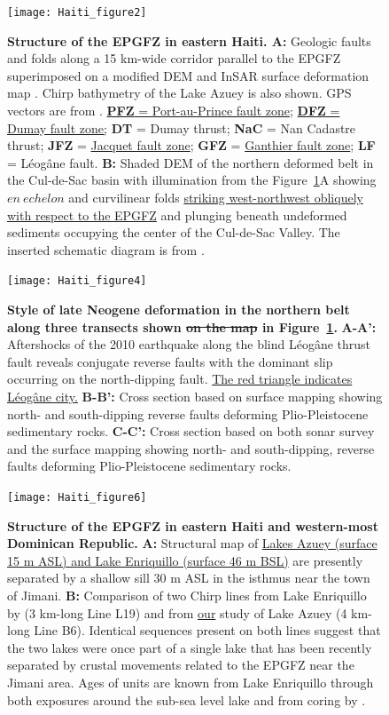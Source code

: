 \documentclass[linenumbers,draft]{agujournal}
\begin{document}
\begin{figure}
\centering
\texttt{[image: Haiti\_figure2]}
\caption{\textbf{Structure of the EPGFZ in eastern Haiti. A:} Geologic faults and folds along a 15 km-wide corridor parallel to the EPGFZ superimposed on a modified DEM and InSAR surface deformation map \citep{hayes2010complex,hashimoto2011fan}. Chirp bathymetry of the Lake Azuey is also shown. GPS vectors are from \citet{calais2010transpressional}. \underline{\textbf{PFZ} = Port-au-Prince fault zone}; \underline{\textbf{DFZ} = Dumay fault zone;} \textbf{DT} = Dumay thrust; \textbf{NaC} = Nan Cadastre thrust; \textbf{JFZ} = \ul{Jacquet fault zone}; \textbf{GFZ} = \ul{Ganthier fault zone}; \textbf{LF} = L\'eog\^ane fault. \textbf{B:} Shaded DEM of the northern deformed belt in the Cul-de-Sac basin with illumination from the Figure~\ref{figure2}A showing $en~echelon$ and curvilinear folds \underline{striking west-northwest obliquely with respect to the EPGFZ} and plunging beneath undeformed sediments occupying the center of the Cul-de-Sac Valley. The inserted schematic diagram is from \citet{odonne1983analogue}.}
\label{figure2}
\end{figure}

\begin{figure}
\centering
\texttt{[image: Haiti\_figure4]}
\caption{\textbf{Style of late Neogene deformation in the northern belt along three transects shown \st{on the map} in Figure~\ref{figure2}.} \textbf{A-A':} Aftershocks of the 2010 earthquake along the blind L\'eog\^ane thrust fault reveals conjugate reverse faults with the dominant slip occurring on the north-dipping fault. \ul{The red triangle indicates L\'eog\^ane city.} \textbf{B-B':} Cross section based on surface mapping showing north- and south-dipping reverse faults deforming Plio-Pleistocene sedimentary rocks. \textbf{C-C':} Cross section based on both sonar survey and the surface mapping showing north- and south-dipping, reverse faults deforming Plio-Pleistocene sedimentary rocks.}
\label{figure3}
\end{figure}

\begin{figure}
\centering
\texttt{[image: Haiti\_figure6]}
\caption{\textbf{Structure of the EPGFZ in eastern Haiti and western-most Dominican Republic.} \textbf{A:} Structural map of \ul{Lakes Azuey (surface 15 m ASL) and Lake Enriquillo (surface 46 m BSL)} are presently separated by a shallow sill 30 m ASL in the isthmus near the town of Jimani. \textbf{B:} Comparison of two Chirp lines from Lake Enriquillo by \citet{rios2013holocene} (3 km-long Line L19) and from \ul{our} study of Lake Azuey (4 km-long Line B6). Identical sequences present on both lines suggest that the two lakes were once part of a single lake that has been recently separated by crustal movements related to the EPGFZ near the Jimani area. Ages of units are known from Lake Enriquillo through both exposures around the sub-sea level lake and from coring by \citet{rios2013holocene}.}
\label{figure4}
\end{figure}
\end{document}
